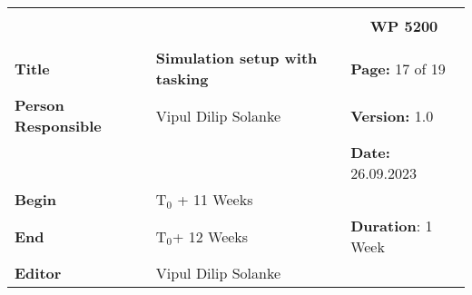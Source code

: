 \begin{table}[!h]
  \begin{center}
    \begin{tabular}{|p{35mm}||p{55mm}|p{50mm}||p{40mm}|}
      \hline
      \multicolumn{3}{|l||}{\textbf{}} & \multicolumn{1}{c|}{}                                                                                                                                                \\
      \multicolumn{3}{|l||}{\textbf{}} & \multicolumn{1}{c|}{\textbf{WP 5200}}                                                                                                                                \\
      \multicolumn{3}{|l||}{\textbf{}} & \multicolumn{1}{c|}{}                                                                                                                                                \\
      \hline\hline
      \textbf{Title}                   & \multicolumn{2}{p{7cm}||}{\textbf{Simulation setup with tasking}}
                                       & \textbf{Page:} 17 of 19                                                                                                                                              \\
      \hline
      \textbf{Person Responsible}        & \multicolumn{2}{l||}{Vipul Dilip Solanke}                                                                                                   & \textbf{Version:} 1.0   \\
      \hline
      \multicolumn{3}{|l||}{}          & \textbf{Date:} 26.09.2023                                                                                                                                          \\
      \hline\hline
      \textbf{Begin}                  & \multicolumn{2}{l||}{T$_0$ + 11 Weeks}                                                                                                                &                         \\
      \hline
      \textbf{End}                    & \multicolumn{2}{l||}{T$_0$+ 12 Weeks}                                                                                                        & \textbf{Duration}: 1 Week \\
      \hline\hline
      \textbf{Editor}              & \multicolumn{3}{l|}{Vipul Dilip Solanke}                                                                                                                              \\

\end{tabular}
\end{center}
\end{table}
